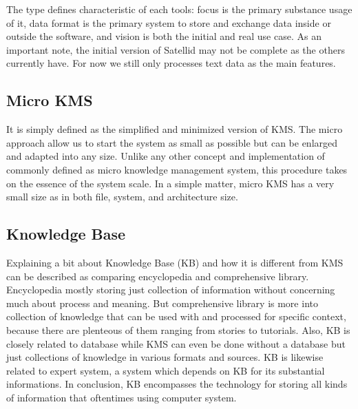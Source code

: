 The type defines characteristic of each tools: focus is the primary substance usage of it, data format is the primary system to store and exchange data inside or outside the software, and vision is both the initial and real use case.
As an important note, the initial version of Satellid may not be complete as the others currently have.
For now we still only processes text data as the main features.

\subsection{Micro {KMS}}

It is simply defined as the simplified and minimized version of \ac{KMS}.
The micro approach allow us to start the system as small as possible but can be enlarged and adapted into any size.
Unlike any other concept and implementation of commonly defined as micro knowledge management system, this procedure takes on the essence of the system scale.
In a simple matter, micro \ac{KMS} has a very small size as in both file, system, and architecture size.

\subsection{Knowledge Base}

Explaining a bit about Knowledge Base  (\ac{KB}) and how it is different from \ac{KMS} can be described as comparing encyclopedia and comprehensive library.
Encyclopedia mostly storing just collection of information without concerning much about process and meaning.
But comprehensive library is more into collection of knowledge that can be used with and processed for specific context, because there are plenteous of them ranging from stories to tutorials.
Also, \ac{KB} is closely related to database while \ac{KMS} can even be done without a database but just collections of knowledge in various formats and sources.
\ac{KB} is likewise related to expert system, a system which depends on \ac{KB} for its substantial informations.
In conclusion, \ac{KB} encompasses the technology for storing all kinds of information that oftentimes using computer system.
